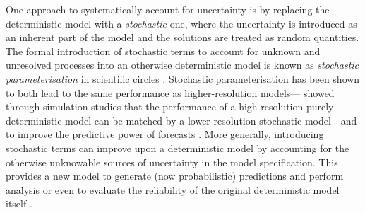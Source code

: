 One approach to systematically account for uncertainty is by replacing the deterministic model with a \emph{stochastic} one, where the uncertainty is introduced as an inherent part of the model and the solutions are treated as random quantities.
The formal introduction of stochastic terms to account for unknown and unresolved processes into an otherwise deterministic model is known as \emph{stochastic parameterisation} in scientific circles \citep{BernerEtAl_2017_StochasticParameterizationNew,Palmer_2019_StochasticWeatherClimate}.
Stochastic parameterisation has been shown to both lead to the same performance as higher-resolution models---\citet{DawsonPalmer_2015_SimulatingWeatherRegimes} showed through simulation studies that the performance of a high-resolution purely deterministic model can be matched by a lower-resolution stochastic model---and to improve the predictive power of forecasts \citep{MitchellGottwald_2012_DataAssimilationSlow,HaEtAl_2015_ComparisonModelError}.
More generally, introducing stochastic terms can improve upon a deterministic model by accounting for the otherwise unknowable sources of uncertainty in the model specification.
This provides a new model to generate (now probabilistic) predictions and perform analysis or even to evaluate the reliability of the original deterministic model itself \citep{Balasuriya_2020_StochasticSensitivityComputable}.

